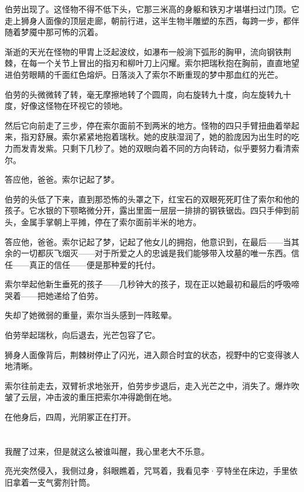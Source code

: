 \documentclass[AutoFakeBold=true]{book}
\begin{document}
伯劳出现了。这怪物不得不低下头，它那三米高的身躯和铁刃才堪堪扫过门顶。它走上狮身人面像的顶层走廊，朝前行进，这半生物半雕塑的东西，每跨一步，都伴随着梦魇中那可怖的沉着。

渐逝的天光在怪物的甲胄上泛起波纹，如瀑布一般淌下弧形的胸甲，流向钢铁荆棘，在每一个关节上冒出的指刃和柳叶刀上闪耀。索尔把瑞秋抱在胸前，直直地望进伯劳眼睛的千面红色熔炉。日落淡入了索尔不断重现的梦中那血红的光芒。

伯劳的头微微转了转，毫无摩擦地转了个圆周，向右旋转九十度，向左旋转九十度，好像这怪物在环视它的领地。

然后它向前走了三步，停在索尔面前不到两米的地方。怪物的四只手臂扭曲着举起来，指刃舒展。索尔紧紧地抱着瑞秋。她的皮肤湿润了，她的脸庞因为出生时的吃力而发青发紫。只剩下几秒了。她的双眼向着不同的方向转动，似乎要努力看清索尔。

{\kaishu 答应他，爸爸。}索尔记起了梦。

伯劳的头低了下来，直到那恐怖的头罩之下，红宝石的双眼死死盯住了索尔和他的孩子。它水银的下颚略微分开，露出里面一层层一排排的钢铁锯齿。四只手伸到前头，金属手掌朝上平摊，停在了索尔面前半米的地方。

{\kaishu 答应他，爸爸。}索尔记起了梦，记起了他女儿的拥抱，他意识到，在最后——当其余的一切都灰飞烟灭——对于所爱之人的忠诚是我们能够带入坟墓的唯一东西。信任——真正的信任——便是那种爱的托付。

索尔举起他新生垂死的孩子——几秒钟大的孩子，现在正以她最初和最后的呼吸啼哭着——把她递给了伯劳。

失却了她微弱的重量，索尔当头感到一阵眩晕。

伯劳举起瑞秋，向后退去，光芒包容了它。

狮身人面像背后，荆棘树停止了闪光，进入颇合时宜的状态，视野中的它变得骇人地清晰。

索尔往前走去，双臂祈求地张开，伯劳步步退后，走入光芒之中，消失了。爆炸吹皱了云层，冲击波的重压把索尔冲得跪倒在地。

在他身后，四周，光阴冢正在打开。

\part{}

\chapter{}

我醒了过来，但是就这么被谁叫醒，我心里老大不乐意。

亮光突然侵入，我侧过身，斜眼瞧着，咒骂着，我看见李·亨特坐在床边，手里依旧拿着一支气雾剂针筒。
\end{document}
